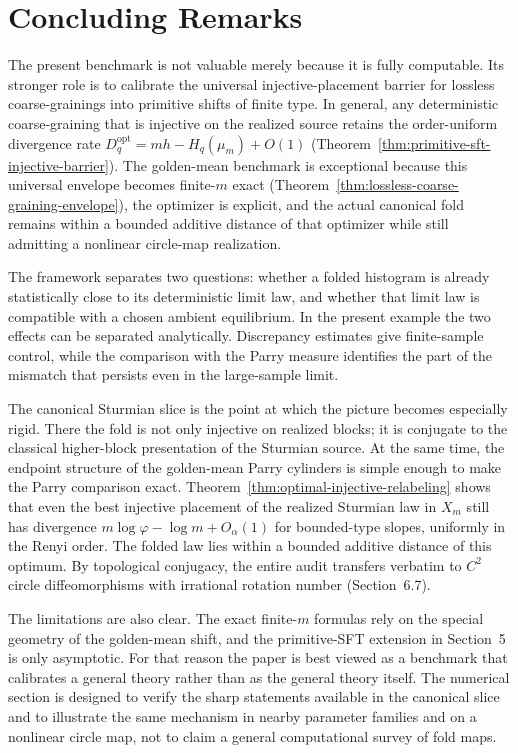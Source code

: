 \documentclass[11pt,letterpaper]{article}
\numberwithin{equation}{section}
\theoremstyle{plain}
\theoremstyle{definition}
\theoremstyle{remark}
\begin{document}
\section{Concluding Remarks}

The present benchmark is not valuable merely because it is fully computable.
Its stronger role is to calibrate the universal injective-placement barrier
for lossless coarse-grainings into primitive shifts of finite type. In
general, any deterministic coarse-graining that is injective on the realized
source retains the order-uniform divergence rate
\(D_q^{\mathrm{opt}}=mh-H_q(\mu_m)+O(1)\)
(Theorem~\ref{thm:primitive-sft-injective-barrier}). The golden-mean
benchmark is exceptional because this universal envelope becomes
finite-\(m\) exact
(Theorem~\ref{thm:lossless-coarse-graining-envelope}), the optimizer is
explicit, and the actual canonical fold remains within a bounded additive
distance of that optimizer while still admitting a nonlinear circle-map
realization.

The framework separates two questions: whether a folded histogram is already
statistically close to its deterministic limit law, and whether that limit law
is compatible with a chosen ambient equilibrium. In the present example the two
effects can be separated analytically. Discrepancy estimates give
finite-sample control, while the comparison with the Parry measure identifies
the part of the mismatch that persists even in the large-sample limit.

The canonical Sturmian slice is the point at which the picture becomes
especially rigid. There the fold is not only injective on realized blocks; it
is conjugate to the classical higher-block presentation of the Sturmian source.
At the same time, the endpoint structure of the golden-mean Parry cylinders is
simple enough to make the Parry comparison exact.
Theorem~\ref{thm:optimal-injective-relabeling} shows that even the best
injective placement of the realized Sturmian law in \(X_m\) still has
divergence \(m\log\varphi-\log m+O_\alpha(1)\) for bounded-type slopes,
uniformly in the Renyi order. The folded law lies within a bounded additive
distance of this optimum. By topological conjugacy, the entire audit transfers
verbatim to \(C^2\) circle diffeomorphisms with irrational rotation number
(Section~6.7).

The limitations are also clear. The exact finite-\(m\) formulas rely on the
special geometry of the golden-mean shift, and the primitive-SFT extension in
Section~5 is only asymptotic. For that reason the paper is best viewed as a
benchmark that calibrates a general theory rather than as the general theory
itself. The numerical section is designed to verify the sharp statements
available in the canonical slice and to illustrate the same mechanism in nearby
parameter families and on a nonlinear circle map, not to claim a general
computational survey of fold maps.
\end{document}
